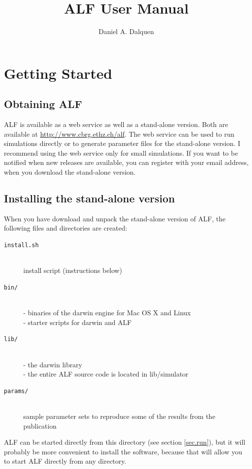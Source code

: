\documentclass[11pt]{article}
\begin{document}

\nobibliography*

\title{ALF User Manual}
\author{Daniel A. Dalquen}
\maketitle

\section{Getting Started}
\subsection{Obtaining ALF}
ALF is available as a web service as well as a stand-alone version. Both are available at \url{http://www.cbrg.ethz.ch/alf}. The web service can be used to run simulations directly or to generate parameter files for the stand-alone version. I recommend using the web service only for small simulations. If you want to be notified when new releases are available, you can register with your email address, when you download the stand-alone version.

\subsection{Installing the stand-alone version}
When you have download and unpack the stand-alone version of ALF, the following
files and directories are created:

\begin{description}
\item[\texttt{install.sh}] \hfill \\
install script (instructions below)
\item[\texttt{bin/}] \hfill \\
       - binaries of the darwin engine for Mac OS X and Linux\hfill \\
	   - starter scripts for darwin and ALF
\item[\texttt{lib/}] \hfill \\
       - the darwin library\hfill \\
	   - the entire ALF source code is located in lib/simulator
\item[\texttt{params/}] \hfill \\
sample parameter sets to reproduce some of the results from the publication
\end{description}

ALF can be started directly from this directory (see section \ref{sec.run}), but it will probably be more convenient to install the software, because that will allow you to start ALF directly from any directory.
\end{document}
